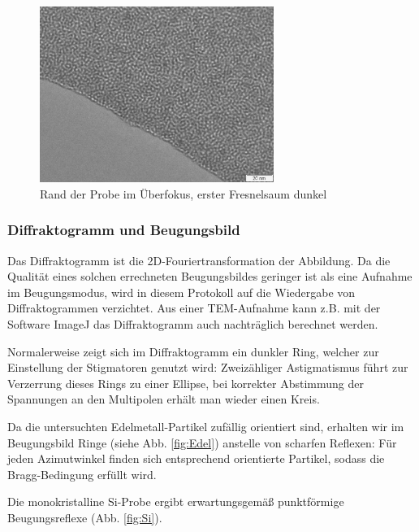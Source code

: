 \begin{figure}[p]
	\centering
	\includegraphics[width=0.68\textwidth]{data/Im_2.jpg}
	\vspace{-1.5ex}
	\caption{Rand der Probe im Überfokus, erster Fresnelsaum dunkel}	\label{fig:Ueber}
	\vspace{-9em}
\end{figure}

\subsubsection{Diffraktogramm und Beugungsbild}
Das Diffraktogramm ist die 2D-Fouriertransformation der Abbildung. Da die Qualität eines solchen errechneten Beugungsbildes geringer ist als eine Aufnahme im Beugungsmodus, wird in diesem Protokoll auf die Wiedergabe von Diffraktogrammen verzichtet. Aus einer TEM-Aufnahme kann z.B. mit der Software ImageJ \cite{lit:ImageJ} das Diffraktogramm auch nachträglich berechnet werden.


Normalerweise zeigt sich im Diffraktogramm ein dunkler Ring, welcher zur Einstellung der Stigmatoren genutzt wird: Zweizähliger Astigmatismus führt zur Verzerrung dieses Rings zu einer Ellipse, bei korrekter Abstimmung der Spannungen an den Multipolen erhält man wieder einen Kreis.

Da die untersuchten Edelmetall-Partikel zufällig orientiert sind, erhalten wir im Beugungsbild Ringe (siehe Abb. \ref{fig:Edel}) anstelle von scharfen Reflexen: Für jeden Azimutwinkel finden sich entsprechend orientierte Partikel, sodass die Bragg-Bedingung erfüllt wird.

Die monokristalline \textsf{Si}-Probe ergibt erwartungsgemäß punktförmige Beugungsreflexe (Abb. \ref{fig:Si}).

